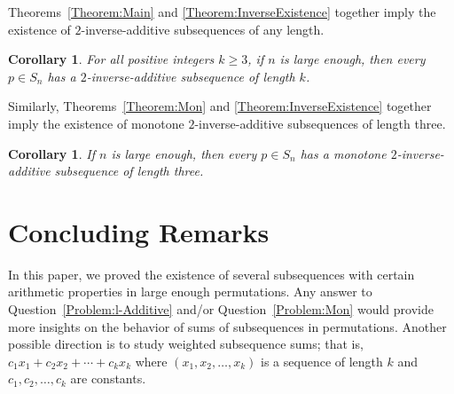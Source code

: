 \documentclass[10pt,a4paper]{amsart}
\newtheorem{corollary}[theorem]{Corollary}
\begin{document}
Theorems~\ref{Theorem:Main} and \ref{Theorem:InverseExistence} together imply the existence of $2$-inverse-additive subsequences of any length.
\begin{corollary}
    For all positive integers $k\geq3$, if $n$ is large enough, then every $p\in S_n$ has a $2$-inverse-additive subsequence of length $k$.
\end{corollary}
Similarly, Theorems~\ref{Theorem:Mon} and \ref{Theorem:InverseExistence} together imply the existence of monotone $2$-inverse-additive subsequences of length three.
\begin{corollary}
    If $n$ is large enough, then every $p\in S_n$ has a monotone $2$-inverse-additive subsequence of length three.
\end{corollary}
\section{Concluding Remarks}\label{Section:Conclu}
In this paper, we proved the existence of several subsequences with certain arithmetic properties in large enough permutations. Any answer to Question~\ref{Problem:l-Additive} and/or Question~\ref{Problem:Mon} would provide more insights on the behavior of sums of subsequences in permutations. Another possible direction is to study weighted subsequence sums; that is, $c_1x_1+c_2x_2+\cdots+c_kx_k$ where $(x_1,x_2,\ldots,x_k)$ is a sequence of length $k$ and $c_1,c_2,\ldots,c_k$ are constants.
\end{document}
